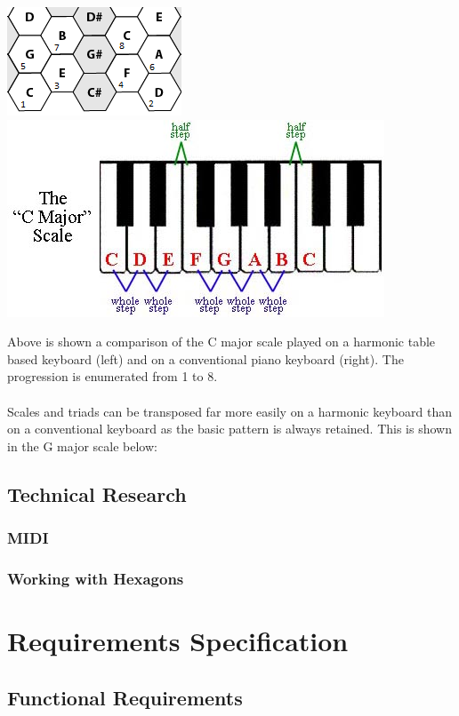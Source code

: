 \documentclass[10pt,a4paper]{article}
\begin{document}
\begin{center}
\includegraphics[scale=0.7]{scale.png}
\includegraphics[scale=1.5]{scale2.jpg}
\end{center}
Above is shown a comparison of the C major scale played on a harmonic table based keyboard (left) and on a conventional piano keyboard (right). The progression is enumerated from 1 to 8.\\
\\
Scales and triads can be transposed far more easily on a harmonic keyboard than on a conventional keyboard as the basic pattern is always retained. This is shown in the G major scale below:


\subsection{Technical Research}
\subsubsection{MIDI}

\subsubsection{Working with Hexagons}

\section{Requirements Specification}

\subsection{Functional Requirements}
\end{document}
